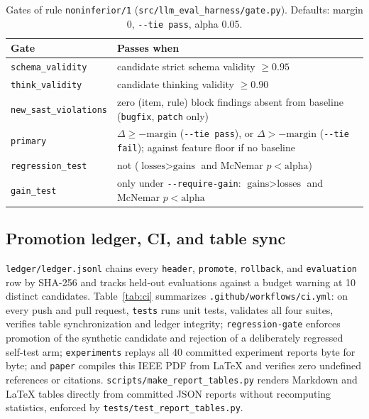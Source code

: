 \documentclass[conference]{IEEEtran}
\begin{document}
\begin{table}[!t]
\caption{Gates of rule \texttt{noninferior/\allowbreak{}1} (\texttt{src/\allowbreak{}llm\_\allowbreak{}eval\_\allowbreak{}harness/\allowbreak{}gate.\allowbreak{}py}). Defaults: margin 0, \texttt{-{}-{}tie pass}, alpha 0.05.}
\label{tab:gates}
\centering
\scriptsize
\setlength{\tabcolsep}{3pt}
\begin{tabular}{l >{\raggedright\arraybackslash}p{}}
\hline
Gate & Passes when \\
\hline
\texttt{schema\_\allowbreak{}validity} & candidate strict schema validity $\ge 0.95$ \\
\texttt{think\_\allowbreak{}validity} & candidate thinking validity $\ge 0.90$ \\
\texttt{new\_\allowbreak{}sast\_\allowbreak{}violations} & zero (item, rule) block findings absent from baseline (\texttt{bugfix}, \texttt{patch} only) \\
\texttt{primary} & $\Delta \ge -\text{margin}$ (\texttt{-{}-{}tie pass}), or $\Delta > -\text{margin}$ (\texttt{-{}-{}tie fail}); against feature floor if no baseline \\
\texttt{regression\_\allowbreak{}test} & not ($\text{losses} > \text{gains}$ and McNemar $p < \text{alpha}$) \\
\texttt{gain\_\allowbreak{}test} & only under \texttt{-{}-{}require-{}gain}: $\text{gains} > \text{losses}$ and McNemar $p < \text{alpha}$ \\
\hline
\end{tabular}
\end{table}

\subsection{Promotion ledger, CI, and table sync}
\label{sec:design-ledger}

\texttt{ledger/\allowbreak{}ledger.\allowbreak{}jsonl} chains every \texttt{header}, \texttt{promote}, \texttt{rollback}, and \texttt{evaluation} row by SHA-256 and tracks held-out evaluations against a budget warning at 10 distinct candidates. Table~\ref{tab:ci} summarizes \texttt{.\allowbreak{}github/\allowbreak{}workflows/\allowbreak{}ci.\allowbreak{}yml}: on every push and pull request, \texttt{tests} runs unit tests, validates all four suites, verifies table synchronization and ledger integrity; \texttt{regression-{}gate} enforces promotion of the synthetic candidate and rejection of a deliberately regressed self-test arm; \texttt{experiments} replays all 40 committed experiment reports byte for byte; and \texttt{paper} compiles this IEEE PDF from \LaTeX{} and verifies zero undefined references or citations. \texttt{scripts/\allowbreak{}make\_\allowbreak{}report\_\allowbreak{}tables.\allowbreak{}py} renders Markdown and LaTeX tables directly from committed JSON reports without recomputing statistics, enforced by \texttt{tests/\allowbreak{}test\_\allowbreak{}report\_\allowbreak{}tables.\allowbreak{}py}.
\end{document}
